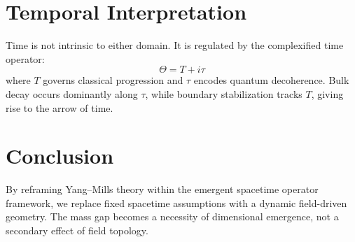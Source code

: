 \documentclass[11pt]{article}
\begin{document}
\section{Temporal Interpretation}
Time is not intrinsic to either domain. It is regulated by the complexified time operator:
\begin{equation}
\Theta = T + i\tau
\end{equation}
where \( T \) governs classical progression and \( \tau \) encodes quantum decoherence. Bulk decay occurs dominantly along \( \tau \), while boundary stabilization tracks \( T \), giving rise to the arrow of time.

\section{Conclusion}
By reframing Yang--Mills theory within the emergent spacetime operator framework, we replace fixed spacetime assumptions with a dynamic field-driven geometry. The mass gap becomes a necessity of dimensional emergence, not a secondary effect of field topology.
\end{document}
